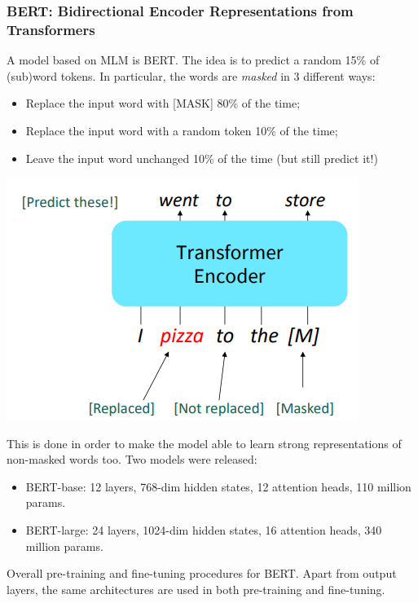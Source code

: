 \subsubsection{BERT: Bidirectional Encoder Representations from Transformers}
A model based on MLM is BERT. The idea is to predict a random 15\% of (sub)word tokens. In particular, the words are \textit{masked} in 3 different ways:
\begin{itemize}
    \item Replace the input word with [MASK] 80\% of the time;

    \item Replace the input word with a random token 10\% of the time;

    \item Leave the input word unchanged 10\% of the time (but still predict it!)
\end{itemize}
\begin{center}
    \includegraphics[scale=0.8]{images/BERT.png}
\end{center}
This is done in order to make the model able to learn strong representations of non-masked words too.\newline\newline
Two models were released:
\begin{itemize}
    \item BERT-base: 12 layers, 768-dim hidden states, 12 attention heads, 110 million params.

    \item BERT-large: 24 layers, 1024-dim hidden states, 16 attention heads, 340 million params.
\end{itemize}
Overall pre-training and fine-tuning procedures for BERT. Apart from output layers, the same architectures are used in both pre-training and fine-tuning.

